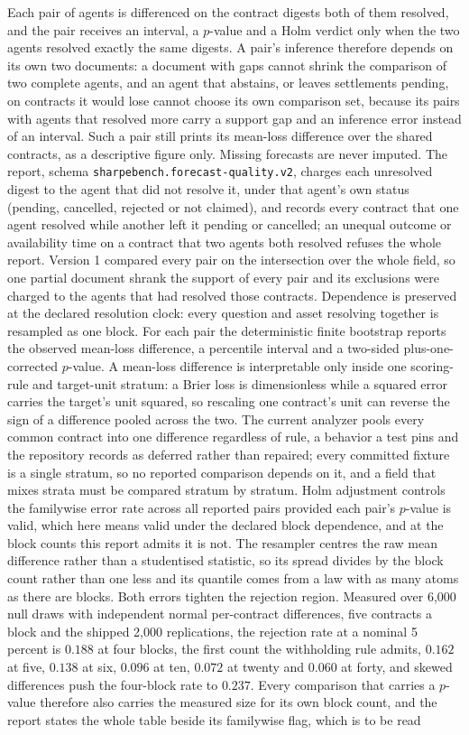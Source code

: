 Each pair of agents is differenced on the contract digests both of them resolved, and the pair receives an interval, a $p$-value and a Holm verdict only when the two agents resolved exactly the same digests. A pair's inference therefore depends on its own two documents: a document with gaps cannot shrink the comparison of two complete agents, and an agent that abstains, or leaves settlements pending, on contracts it would lose cannot choose its own comparison set, because its pairs with agents that resolved more carry a support gap and an inference error instead of an interval. Such a pair still prints its mean-loss difference over the shared contracts, as a descriptive figure only. Missing forecasts are never imputed. The report, schema \texttt{sharpebench.forecast-quality.v2}, charges each unresolved digest to the agent that did not resolve it, under that agent's own status (pending, cancelled, rejected or not claimed), and records every contract that one agent resolved while another left it pending or cancelled; an unequal outcome or availability time on a contract that two agents both resolved refuses the whole report. Version 1 compared every pair on the intersection over the whole field, so one partial document shrank the support of every pair and its exclusions were charged to the agents that had resolved those contracts. Dependence is preserved at the declared resolution clock: every question and asset resolving together is resampled as one block. For each pair the deterministic finite bootstrap reports the observed mean-loss difference, a percentile interval and a two-sided plus-one-corrected $p$-value. A mean-loss difference is interpretable only inside one scoring-rule and target-unit stratum: a Brier loss is dimensionless while a squared error carries the target's unit squared, so rescaling one contract's unit can reverse the sign of a difference pooled across the two. The current analyzer pools every common contract into one difference regardless of rule, a behavior a test pins and the repository records as deferred rather than repaired; every committed fixture is a single stratum, so no reported comparison depends on it, and a field that mixes strata must be compared stratum by stratum. Holm adjustment controls the familywise error rate across all reported pairs provided each pair's $p$-value is valid, which here means valid under the declared block dependence, and at the block counts this report admits it is not. The resampler centres the raw mean difference rather than a studentised statistic, so its spread divides by the block count rather than one less and its quantile comes from a law with as many atoms as there are blocks. Both errors tighten the rejection region. Measured over 6{,}000 null draws with independent normal per-contract differences, five contracts a block and the shipped 2{,}000 replications, the rejection rate at a nominal 5 percent is $0.188$ at four blocks, the first count the withholding rule admits, $0.162$ at five, $0.138$ at six, $0.096$ at ten, $0.072$ at twenty and $0.060$ at forty, and skewed differences push the four-block rate to $0.237$. Every comparison that carries a $p$-value therefore also carries the measured size for its own block count, and the report states the whole table beside its familywise flag, which is to be read 